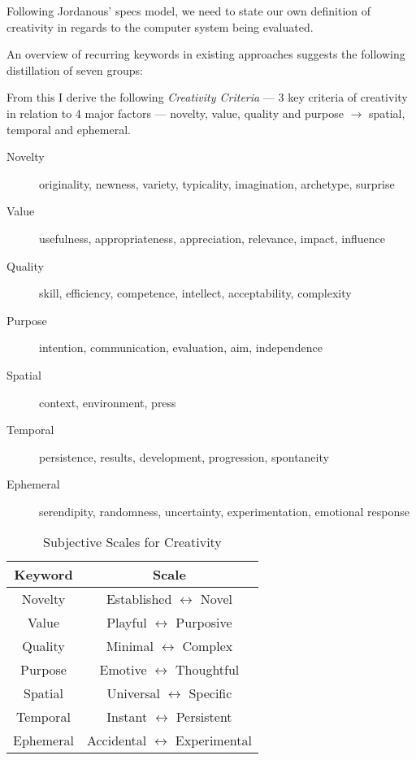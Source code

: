 Following Jordanous' \gls{specs} model, we need to state our own definition of creativity in regards to the computer system being evaluated.

An overview of recurring keywords in existing approaches suggests the following distillation of seven groups:

From this I derive the following \hypertarget{creadef}{\emph{Creativity Criteria}} --- 3 key criteria of creativity in relation to 4 major factors --- novelty, value, quality and purpose $\to$ spatial, temporal and ephemeral.

\begin{description}
  \item [Novelty] originality, newness, variety, typicality, imagination, archetype, surprise
  \item [Value] usefulness, appropriateness, appreciation, relevance, impact, influence
  \item [Quality] skill, efficiency, competence, intellect, acceptability, complexity
  \item [Purpose] intention, communication, evaluation, aim, independence
  \item [Spatial] context, environment, press
  \item [Temporal] persistence, results, development, progression, spontaneity
  \item [Ephemeral] serendipity, randomness, uncertainty, experimentation, emotional response
\end{description}


\begin{table}[!htbp]
\centering
  \begin{tabu}{cc}
  \toprule
  \textbf{Keyword} & \textbf{Scale} \\
  \midrule
  Novelty & Established $\leftrightarrow$ Novel \\
  Value & Playful $\leftrightarrow$ Purposive \\
  Quality & Minimal $\leftrightarrow$ Complex \\
  Purpose & Emotive $\leftrightarrow$ Thoughtful \\
  Spatial & Universal $\leftrightarrow$ Specific \\
  Temporal & Instant $\leftrightarrow$ Persistent \\
  Ephemeral & Accidental $\leftrightarrow$ Experimental \\
  \bottomrule
  \end{tabu}
\caption[Subjective Scales for Creativity]{Subjective Scales for Creativity}
\label{table_subcreat}
\end{table}


